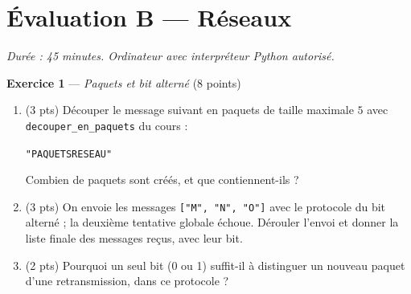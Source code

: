\section*{Évaluation B --- Réseaux}
\textit{Durée : 45 minutes. Ordinateur avec interpréteur Python autorisé.}


\bigskip

\textbf{Exercice 1} --- \textit{Paquets et bit alterné} \hfill (8 points)

\begin{enumerate}
  \item (3 pts) Découper le message suivant en paquets de taille maximale $5$ avec
  \lstinline{decouper_en_paquets} du cours :
  \begin{center}\lstinline{"PAQUETSRESEAU"}\end{center}
  Combien de paquets sont créés, et que contiennent-ils ?
  \item (3 pts) On envoie les messages \lstinline{["M", "N", "O"]} avec le protocole du bit alterné ; la deuxième tentative globale échoue. Dérouler l'envoi et donner la liste finale des messages reçus, avec leur bit.
  \item (2 pts) Pourquoi un seul bit (0 ou 1) suffit-il à distinguer un nouveau paquet d'une retransmission, dans ce protocole ?
\end{enumerate}


